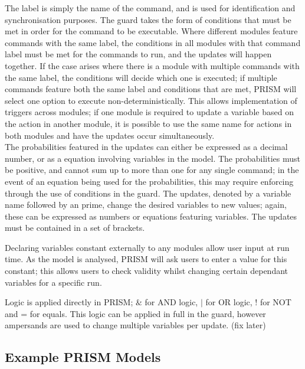 \documentclass{l4proj}
\begin{document}
The label is simply the name of the command, and is used for identification and synchronisation purposes. The guard takes the form of conditions that must be met in order for the command to be executable. Where different modules feature commands with the same label, the conditions in all modules with that command label must be met for the commands to run, and the updates will happen together. If the case arises where there is a module with multiple commands with the same label, the conditions will decide which one is executed; if multiple commands feature both the same label and conditions that are met, PRISM will select one option to execute non-deterministically. This allows implementation of triggers across modules; if one module is required to update a variable based on the action in another module, it is possible to use the same name for actions in both modules and have the updates occur simultaneously.\\
The probabilities featured in the updates can either be expressed as a decimal number, or as a equation involving variables in the model. The probabilities must be positive, and cannot sum up to more than one for any single command; in the event of an equation being used for the probabilities, this may require enforcing through the use of conditions in the guard. The updates, denoted by a variable name followed by an prime, change the desired variables to new values; again, these can be expressed as numbers or equations featuring variables. The updates must be contained in a set of brackets.

Declaring variables constant externally to any modules allow user input at run time. As the model is analysed, PRISM will ask users to enter a value for this constant; this allows users to check validity whilst changing certain dependant variables for a specific run.

Logic is applied directly in PRISM; $ \& $ for AND logic, $ \mid $ for OR logic, ! for NOT and = for equals. This logic can be applied in full in the guard, however ampersands are used to change multiple variables per update. (fix later)



\subsection{Example PRISM Models}
\end{document}
